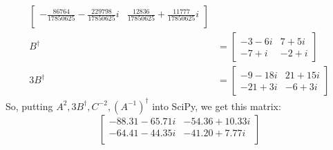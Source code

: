 \documentclass{article}
\begin{document}
\begin{align*}
\begin{bmatrix}
                    -\frac{86764}{17850625} - \frac{229798}{17850625}i & \frac{12836}{17850625} + \frac{11777}{17850625}i\\
                \end{bmatrix}
                \\
                B^{\dagger} &= 
                \begin{bmatrix}
                    -3 - 6 i & 7 + 5 i \\
                    -7 + i & -2 + i
                \end{bmatrix}
                \\
                3B^{\dagger} &= 
                \begin{bmatrix}
                    -9 - 18i & 21 + 15i \\
                    -21 + 3i & -6 + 3i
                \end{bmatrix}
            \end{align*}
            So, putting $A^2,3B^{\dagger},C^{-2},(A^{-1})^{\dagger}$ into SciPy, we get this matrix:
            \[
                \begin{bmatrix}
                -88.31 - 65.71i & -54.36 + 10.33i \\
                -64.41 - 44.35i & -41.20 + 7.77i \\
                \end{bmatrix}
            \]

            
\end{document}
